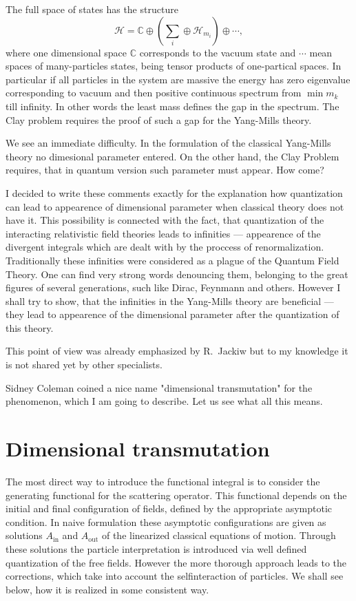 \documentclass[12pt]{article}
\newcommand{\CCC}{\mathbb{C}}
\newcommand{\HH} {\mathcal{H}}
\begin{document}
	The full space of states has the structure
\begin{equation*}
        \HH = \CCC \oplus \left( \sum_{i} \oplus \HH_{m_{i}} \right)
		\oplus \cdots ,
\end{equation*}
	where one dimensional space 
    $ \CCC $
	corresponds to the vacuum state
	and 
    $ \cdots $ 
	mean spaces of many-particles states, being tensor products 
	of one-partical	spaces. 
	In particular if all particles in the system are massive
	the energy has zero eigenvalue corresponding to vacuum and then
	positive continuous spectrum from
    $ \min m_{k} $
	till infinity. In other words the least mass defines the gap in
	the spectrum. The Clay problem requires the proof of such a gap
	for the Yang-Mills theory.

	We see an immediate difficulty. In the formulation of the 
	classical Yang-Mills theory no dimesional parameter entered.
	On the other hand, the Clay Problem requires, that in quantum
	version such parameter must appear. How come?

	I decided to write these comments exactly for the explanation 
	how quantization can lead to appearence of dimensional parameter
	when classical theory does not have it. This possibility is
	connected with the fact, that quantization of the interacting
	relativistic field theories leads to infinities --- appearence
	of the divergent integrals which are dealt with by the proccess
	of renormalization. Traditionally these infinities were 
	considered as a plague of the Quantum Field Theory.
	One can find very strong words denouncing them, belonging to the
	great figures of several generations, such like Dirac, Feynmann
	and others. However I shall try to show, that the infinities in
	the Yang-Mills theory are beneficial --- they lead to
	appearence of the dimensional parameter after the quantization
	of this theory.

	This point of view was already emphasized by R.~Jackiw
\cite{RJ}
	but to my knowledge it is not shared yet by other specialists.

	Sidney Coleman
\cite{SC}
	coined a nice name "dimensional transmutation" for the phenomenon, 
	which I am going to describe. Let us see what all this
	means.

\section{Dimensional transmutation}
	The most direct way to introduce the functional integral
	is to consider the generating functional for the scattering
	operator.
	This functional depends on the initial and final configuration
	of fields, defined by the appropriate asymptotic condition.
	In naive formulation these asymptotic configurations are
	given as solutions
    $ A_{\text{in}} $ and
    $ A_{\text{out}} $
	of the linearized classical equations of motion.
	Through these solutions the particle interpretation is introduced
	via well defined quantization of the free fields.
	However the more thorough approach leads to the corrections,
	which take into account the selfinteraction of particles.
	We shall see below, how it is realized in some consistent
	way.
\end{document}
